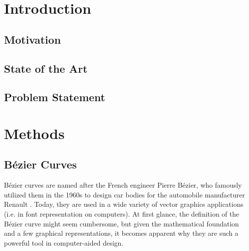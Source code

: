 \documentclass[a4paper, 11pt]{report}
\theoremstyle{definition}
\begin{document}
\restoregeometry
\begin{abstract}
	\thispagestyle{plain}
	\setcounter{page}{3}
	\lipsum[1-3]
\end{abstract}
\renewcommand{\abstractname}{Zusammenfassung}
\begin{abstract}
	\thispagestyle{plain}
	\setcounter{page}{4}
	\lipsum[4-6]
\end{abstract}
\pagebreak

\setcounter{page}{5}
\restoregeometry
\tableofcontents
\pagebreak

\restoregeometry
{}
\setcounter{page}{1}
\pagestyle{plain}

\chapter{Introduction}
\section{Motivation}
\section{State of the Art}
\section{Problem Statement}

\chapter{Methods}
\section{Bézier Curves}
Bézier curves are named after the French engineer Pierre Bézier, who famously utilized them in the 1960s to design car bodies for the automobile manufacturer Renault \cite{Bezier1968}. Today, they are used in a wide variety of vector graphics applications (i.e. in font representation on computers). At first glance, the definition of the Bézier curve might seem cumbersome, but given the mathematical foundation and a few graphical representations, it becomes apparent why they are such a powerful tool in computer-aided design.
\end{document}
